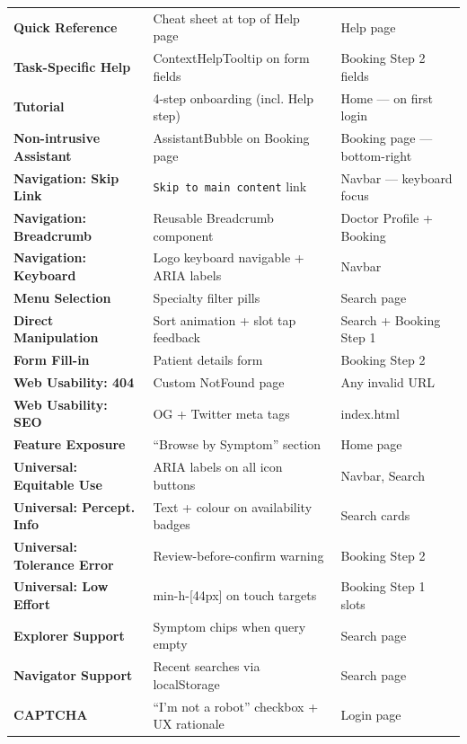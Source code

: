 \documentclass[12pt, a4paper]{article}
\begin{document}
\begin{center}
\begin{longtable}{>{\bfseries}p{3.5cm} p{4cm} p{5cm}}
Quick Reference & Cheat sheet at top of Help page & Help page \\
Task-Specific Help & ContextHelpTooltip on form fields & Booking Step 2 fields \\
Tutorial & 4-step onboarding (incl. Help step) & Home --- on first login \\
Non-intrusive Assistant & AssistantBubble on Booking page & Booking page --- bottom-right \\
Navigation: Skip Link & \texttt{Skip to main content} link & Navbar --- keyboard focus \\
Navigation: Breadcrumb & Reusable Breadcrumb component & Doctor Profile + Booking \\
Navigation: Keyboard & Logo keyboard navigable + ARIA labels & Navbar \\
Menu Selection & Specialty filter pills & Search page \\
Direct Manipulation & Sort animation + slot tap feedback & Search + Booking Step 1 \\
Form Fill-in & Patient details form & Booking Step 2 \\
Web Usability: 404 & Custom NotFound page & Any invalid URL \\
Web Usability: SEO & OG + Twitter meta tags & index.html \\
Feature Exposure & ``Browse by Symptom'' section & Home page \\
Universal: Equitable Use & ARIA labels on all icon buttons & Navbar, Search \\
Universal: Percept. Info & Text + colour on availability badges & Search cards \\
Universal: Tolerance Error & Review-before-confirm warning & Booking Step 2 \\
Universal: Low Effort & min-h-[44px] on touch targets & Booking Step 1 slots \\
Explorer Support & Symptom chips when query empty & Search page \\
Navigator Support & Recent searches via localStorage & Search page \\
CAPTCHA & ``I'm not a robot'' checkbox + UX rationale & Login page \\
\bottomrule
\end{longtable}
\end{center}

\vspace{0.5cm}

\end{document}

